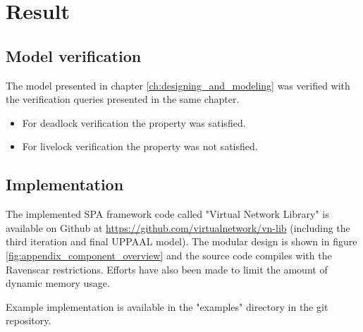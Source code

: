 \chapter{Result}\label{ch:result}
\section{Model verification}
The model presented in chapter \ref{ch:designing_and_modeling} was verified
with the verification queries presented in the same chapter.

\begin{itemize}
    \item For deadlock verification the property was satisfied.
    \item For livelock verification the property was not satisfied.
\end{itemize}


\section{Implementation}
The implemented SPA framework code called "Virtual Network Library" is
available on Github at \url{https://github.com/virtualnetwork/vn-lib}
(including the third iteration and final UPPAAL model). The
modular design is shown in figure \ref{fig:appendix_component_overview} and the
source code compiles with the Ravenscar restrictions. Efforts have also been
made to limit the amount of dynamic memory usage.

Example implementation is available in the "examples" directory in the git
repository.
